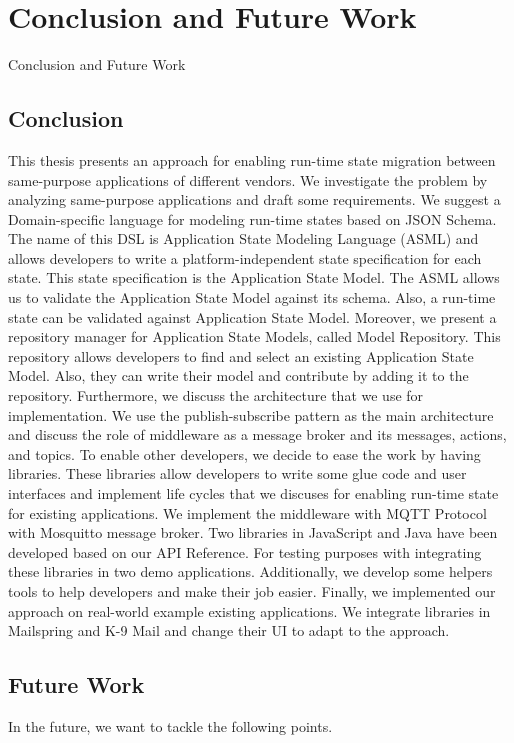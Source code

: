 \chapter{Conclusion and Future Work}
\label{ch:conclusion}

Conclusion and Future Work
\section{Conclusion}
This thesis presents an approach for enabling run-time state migration between same-purpose applications of different vendors. We investigate the problem by analyzing same-purpose applications and draft some requirements. We suggest a Domain-specific language for modeling run-time states based on JSON Schema. The name of this DSL is Application State Modeling Language (ASML) and allows developers to write a platform-independent state specification for each state. This state specification is the Application State Model. The ASML allows us to validate the Application State Model against its schema. Also, a run-time state can be validated against Application State Model.
Moreover, we present a repository manager for Application State Models, called Model Repository. This repository allows developers to find and select an existing Application State Model. Also, they can write their model and contribute by adding it to the repository. Furthermore, we discuss the architecture that we use for implementation. We use the publish-subscribe pattern as the main architecture and discuss the role of middleware as a message broker and its messages, actions, and topics. To enable other developers, we decide to ease the work by having libraries. These libraries allow developers to write some glue code and user interfaces and implement life cycles that we discuses for enabling run-time state for existing applications. We implement the middleware with MQTT Protocol with Mosquitto message broker. Two libraries in JavaScript and Java have been developed based on our API Reference. For testing purposes with integrating these libraries in two demo applications.
Additionally, we develop some helpers tools to help developers and make their job easier. Finally, we implemented our approach on real-world example existing applications. We integrate libraries in Mailspring and K-9 Mail and change their UI to adapt to the approach.

\newpage
\section {Future Work}
In the future, we want to tackle the following points. 
